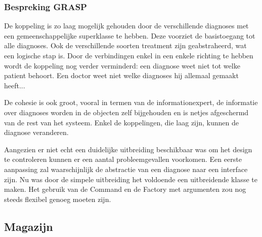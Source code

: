\documentclass[a4paper]{article}
\begin{document}
\subsubsection{Bespreking GRASP}
De koppeling is zo laag mogelijk gehouden door de verschillende diagnoses met een gemeenschappelijke superklasse te hebben. Deze voorziet de basistoegang tot alle diagnoses. Ook de verschillende soorten treatment zijn geabstraheerd, wat een logische stap is. Door de verbindingen enkel in een enkele richting te hebben wordt de koppeling nog verder verminderd: een diagnose weet niet tot welke patient behoort. Een doctor weet niet welke diagnoses hij allemaal gemaakt heeft... 

De cohesie is ook groot, vooral in termen van de informationexpert, de informatie over diagnoses worden in de objecten zelf bijgehouden en is netjes afgeschermd van de rest van het systeem. Enkel de koppelingen, die laag zijn, kunnen de diagnose veranderen.

Aangezien er niet echt een duidelijke uitbreiding beschikbaar was om het design te controleren kunnen er een aantal probleemgevallen voorkomen. Een eerste aanpassing zal waarschijnlijk de abstractie van een diagnose naar een interface zijn. Nu was door de simpele uitbreiding het voldoende een uitbreidende klasse te maken. Het gebruik van de Command en de Factory met argumenten zou nog steeds flexibel genoeg moeten zijn.

\subsection{Magazijn}
\end{document}
